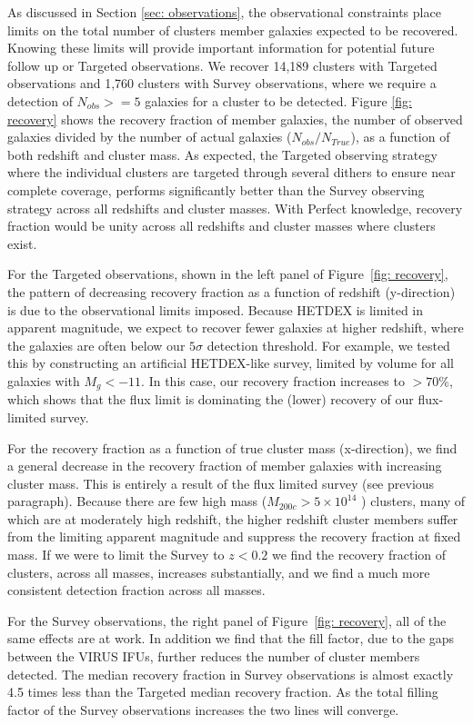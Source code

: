 As discussed in Section \ref{sec: observations}, the observational constraints place limits on the total number of clusters member galaxies expected to be recovered. Knowing these limits will provide important information for potential future follow up or Targeted observations. We recover 14,189 clusters with Targeted observations and 1,760 clusters with Survey observations, where we require a detection of $N_{obs} >=5$ galaxies for a cluster to be detected. Figure \ref{fig: recovery} shows the recovery fraction of member galaxies, the number of observed galaxies divided by the number of actual galaxies ($N_{obs}/N_{True}$), as a function of both redshift and cluster mass. As expected, the Targeted observing strategy where the individual clusters are targeted through several dithers to ensure near complete coverage, performs significantly better than the Survey observing strategy across all redshifts and cluster masses. With Perfect knowledge, recovery fraction would be unity across all redshifts and cluster masses where clusters exist.

For the Targeted observations, shown in the left panel of Figure~\ref{fig: recovery}, the pattern of decreasing recovery fraction as a function of redshift (y-direction) is due to the observational limits imposed. Because HETDEX is limited in apparent magnitude, we expect to recover fewer galaxies at higher redshift, where the galaxies are often below our $5\sigma$ detection threshold. For example, we tested this by constructing an artificial HETDEX-like survey, limited by volume for all galaxies with $M_g < -11$. In this case, our recovery fraction increases to $>70$\%, which shows that the flux limit is dominating the (lower) recovery of our flux-limited survey.

For the recovery fraction as a function of true cluster mass (x-direction), we find a general decrease in the recovery fraction of member galaxies with increasing cluster mass. This  is entirely a result of the flux limited survey (see previous paragraph). Because there are few high mass ($M_{200c}>5\times10^{14}$ \Msol) clusters, many of which are at moderately high redshift, the higher redshift cluster members suffer from the limiting apparent magnitude and suppress the recovery fraction at fixed mass. If we were to limit the Survey to $z<0.2$ we find the recovery fraction of clusters, across all masses, increases substantially, and we find a much more consistent detection fraction across all masses. 

For the Survey observations, the right panel of Figure~\ref{fig: recovery}, all of the same effects are at work. In addition we find that the fill factor, due to the gaps between the VIRUS IFUs, further reduces the number of cluster members detected. The median recovery fraction in Survey observations is almost exactly 4.5 times less than the Targeted median recovery fraction. As the total filling factor of the Survey observations increases the two lines will converge.

